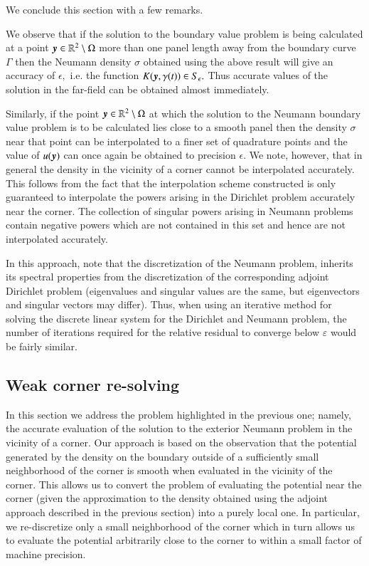 We conclude this section with a few remarks. 

\begin{remark}
\label{rem:far-field-accuracy}
We observe that if the solution to the boundary value problem is being calculated at a point $\boldsymbol{y} \in \mathbb{R}^2\setminus \Omega$ more than one panel length away from the boundary curve $\Gamma$ then the Neumann density $\sigma$ obtained using the above result will give an accuracy of $\epsilon,$ i.e. the function $K(\boldsymbol{y},\gamma(t)) \in S_\epsilon.$ Thus accurate values of the solution in the far-field can be obtained almost immediately.
\end{remark}
\begin{remark}
\label{rem:strong-sol-smooth}
Similarly, if the point $\boldsymbol{y} \in \mathbb{R}^2 \setminus \Omega$ at which the solution to the Neumann boundary value problem is to be calculated lies close to a smooth panel then the density $\sigma$ near that point can be interpolated to a finer set of quadrature points and the value of $u(\boldsymbol{y})$ can once again be obtained to precision $\epsilon.$ We note, however, that in general the density in the vicinity of a corner cannot be interpolated accurately. This follows from the fact that the interpolation scheme constructed is only guaranteed to interpolate the powers arising in the Dirichlet problem accurately near the corner. The collection of singular powers arising in Neumann problems contain negative powers which are not contained in this set and hence are not interpolated accurately.
\end{remark}
{\color{blue}
\begin{remark}
In this approach, note that the discretization of the Neumann problem, inherits its spectral properties from the discretization of the corresponding adjoint Dirichlet problem (eigenvalues and singular values are the same, but eigenvectors and singular vectors may differ). Thus, when using an iterative method for solving the discrete linear system for the Dirichlet and Neumann problem, the number of iterations required for the relative residual to converge below $\varepsilon$ would be fairly similar. 
\end{remark}
}

\subsection{Weak corner re-solving \label{sec:resolve}}
In this section we address the problem highlighted in the previous one; namely, the accurate evaluation of the solution to the exterior Neumann problem in the vicinity of a corner. Our approach is based on the observation that the potential generated by the density on the boundary outside of a sufficiently small neighborhood of the corner is smooth when evaluated in the vicinity of the corner. This allows us to convert the problem of evaluating the potential near the corner (given the approximation to the density obtained using the adjoint approach described in the previous section) into a purely local one. In particular, we re-discretize only a small neighborhood of the corner which in turn allows us to evaluate the potential arbitrarily close to the corner to within a small factor of machine precision. 

